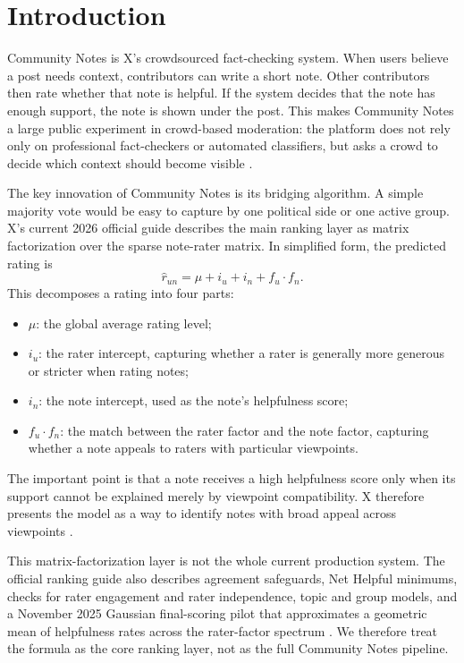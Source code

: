 \documentclass[10pt,twocolumn]{article}
\begin{document}
\section{Introduction}

Community Notes is X's crowdsourced fact-checking system. When users believe a
post needs context, contributors can write a short note. Other contributors
then rate whether that note is helpful. If the system decides that the note has
enough support, the note is shown under the post. This makes Community Notes a
large public experiment in crowd-based moderation: the platform does not rely
only on professional fact-checkers or automated classifiers, but asks a crowd
to decide which context should become visible \citep{wojcik2022birdwatch,
xcommunitynotes2026ranking}.

The key innovation of Community Notes is its bridging algorithm. A simple
majority vote would be easy to capture by one political side or one active
group. X's current 2026 official guide describes the main ranking layer as
matrix factorization over the sparse note-rater matrix. In simplified form, the
predicted rating is
\[
    \hat{r}_{un} = \mu + i_u + i_n + f_u \cdot f_n.
\]
This decomposes a rating into four parts:

\begin{itemize}
    \item $\mu$: the global average rating level;
    \item $i_u$: the rater intercept, capturing whether a rater is generally
    more generous or stricter when rating notes;
    \item $i_n$: the note intercept, used as the note's helpfulness score;
    \item $f_u \cdot f_n$: the match between the rater factor and the note
    factor, capturing whether a note appeals to raters with particular
    viewpoints.
\end{itemize}

The important point is that a note receives a high helpfulness score only when
its support cannot be explained merely by viewpoint compatibility. X therefore
presents the model as a way to identify notes with broad appeal across
viewpoints \citep{xcommunitynotes2026ranking}.

This matrix-factorization layer is not the whole current production system.
The official ranking guide also describes agreement safeguards, Net Helpful
minimums, checks for rater engagement and rater independence, topic and group
models, and a November 2025 Gaussian final-scoring pilot that approximates a
geometric mean of helpfulness rates across the rater-factor spectrum
\citep{xcommunitynotes2026ranking}. We therefore treat the formula as the core
ranking layer, not as the full Community Notes pipeline.
\end{document}
